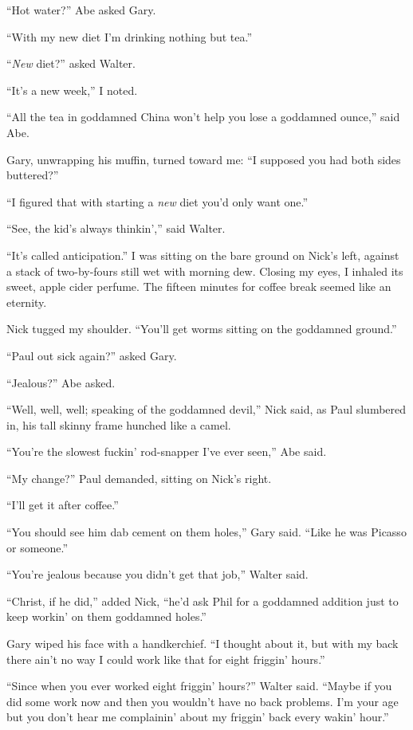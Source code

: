 ``Hot water?'' Abe asked Gary.

``With my new diet I'm drinking nothing but tea.''

``\emph{New} diet?'' asked Walter.

``It's a new week,'' I noted.

``All the tea in goddamned China won't help you lose a goddamned
ounce,'' said Abe.

Gary, unwrapping his muffin, turned toward me: ``I supposed you had both
sides buttered?''

``I figured that with starting a \emph{new} diet you'd only want one.''

``See, the kid's always thinkin','' said Walter.

``It's called anticipation.'' I was sitting on the bare ground on Nick's
left, against a stack of two-by-fours still wet with morning dew.
Closing my eyes, I inhaled its sweet, apple cider perfume. The fifteen
minutes for coffee break seemed like an eternity.

Nick tugged my shoulder. ``You'll get worms sitting on the goddamned
ground.''

``Paul out sick again?'' asked Gary.

``Jealous?'' Abe asked.

``Well, well, well; speaking of the goddamned devil,'' Nick said, as
Paul slumbered in, his tall skinny frame hunched like a camel.

``You're the slowest fuckin' rod-snapper I've ever seen,'' Abe said.

``My change?'' Paul demanded, sitting on Nick's right.

``I'll get it after coffee.''

``You should see him dab cement on them holes,'' Gary said. ``Like he
was Picasso or someone.''

``You're jealous because you didn't get that job,'' Walter said.

``Christ, if he did,'' added Nick, ``he'd ask Phil for a goddamned
addition just to keep workin' on them goddamned holes.''

Gary wiped his face with a handkerchief. ``I thought about it, but with
my back there ain't no way I could work like that for eight friggin'
hours.''

``Since when you ever worked eight friggin' hours?'' Walter said.
``Maybe if you did some work now and then you wouldn't have no back
problems. I'm your age but you don't hear me complainin' about my
friggin' back every wakin' hour.''

